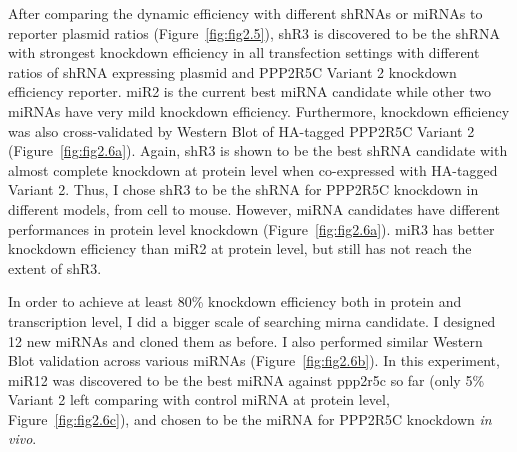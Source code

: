 After comparing the dynamic efficiency with different shRNAs or miRNAs to reporter plasmid ratios (Figure~\ref{fig:fig2.5}), shR3 is discovered to be the shRNA with strongest knockdown efficiency in all transfection settings with different ratios of shRNA expressing plasmid and PPP2R5C Variant 2 knockdown efficiency reporter. miR2 is the current best miRNA candidate while other two miRNAs have very mild knockdown efficiency. Furthermore, knockdown efficiency was also cross-validated by Western Blot of HA-tagged PPP2R5C Variant 2 (Figure~\ref{fig:fig2.6a}). Again, shR3 is shown to be the best shRNA candidate with almost complete knockdown at protein level when co-expressed with HA-tagged Variant 2. Thus, I chose shR3 to be the shRNA for PPP2R5C knockdown in different models, from cell to mouse. However, miRNA candidates have different performances in protein level knockdown (Figure~\ref{fig:fig2.6a}). miR3 has better knockdown efficiency than miR2 at protein level, but still has not reach the extent of shR3.

In order to achieve at least 80\% knockdown efficiency both in protein and transcription level, I did a bigger scale of searching \gls{mirna} candidate. I designed 12 new miRNAs and cloned them as before. I also performed similar Western Blot validation across various miRNAs (Figure~\ref{fig:fig2.6b}). In this experiment, miR12 was discovered to be the best miRNA against \gls{ppp2r5c} so far (only 5\% Variant 2 left comparing with control miRNA at protein level, Figure~\ref{fig:fig2.6c}), and chosen to be the miRNA for PPP2R5C knockdown \textit{in vivo}. 

